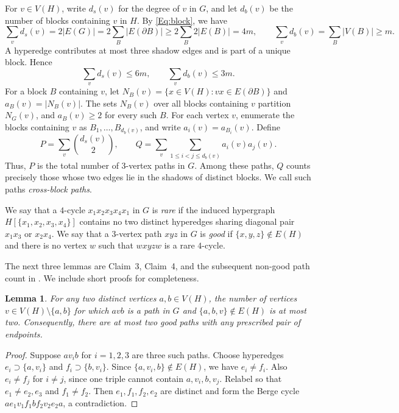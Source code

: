 \documentclass[11pt]{article}
\newtheorem{lemma}[theorem]{Lemma}
\begin{document}
For $v\in V(H)$, write $d_s(v)$ for the degree of $v$ in $G$, and let $d_b(v)$ be the number of blocks containing $v$ in $H$. By \eqref{Eq:block}, we have
\begin{equation}\label{eq:sums_low}       \sum_v d_s(v)=2|E(G)|=2\sum_B |E(\partial B)|
        \ge 2\sum_B 2|E(B)|=4m,   
         \qquad
        \sum_v d_b(v)=\sum_B |V(B)|\ge m.
\end{equation}
A hyperedge contributes at most three shadow edges
and is part of a unique block.  Hence
\[
    \sum_v d_s(v)\le 6m,
        \qquad
        \sum_v d_b(v)\le 3m.
\] 
For a block $B$ containing $v$, let $N_B(v)=\{x\in V(H): vx\in E(\partial B)\}$ and $a_B(v)=|N_B(v)|$. The sets $N_B(v)$ over all blocks containing $v$ partition $N_G(v)$, and $a_B(v)\ge2$ for every such $B$. For each vertex $v$, enumerate the blocks containing $v$ as $B_1,\ldots,B_{d_b(v)}$, and write $a_i(v)=a_{B_i}(v)$. Define
\[
        P=\sum_v\binom{d_s(v)}2,
        \qquad
        Q=\sum_v\sum_{1\le i<j\le d_b(v)}a_i(v)a_j(v).
\]
Thus, \(P\) is the total number of \(3\)-vertex paths in \(G\).
Among these paths, \(Q\) counts precisely those whose two edges lie in the shadows of distinct blocks. We call such paths \emph{cross-block paths}.

We say that a $4$-cycle $x_1x_2x_3x_4x_1$ in $G$ is \emph{rare} if the induced hypergraph $H[\{x_1,x_2,x_3,x_4\}]$ contains no two distinct hyperedges sharing diagonal pair $x_1x_3$ or $x_2x_4$. We say that a $3$-vertex path $xyz$ in $G$ is \emph{good} if $\{x,y,z\}\notin E(H)$ and there is no vertex $w$ such that $wxyzw$ is a rare $4$-cycle.

The next three lemmas are Claim~3, Claim~4, and the subsequent non-good path count in \cite{ergemlidze20203}. We include short proofs for completeness.

\begin{lemma}\label{lem:two-paths}
For any two distinct vertices $a,b\in V(H)$, the number of vertices
$v\in V(H)\setminus\{a,b\}$ for which $avb$ is a path in $G$ and
$\{a,b,v\}\notin E(H)$ is at most two.  Consequently, there are at most two
good paths with any prescribed pair of endpoints.
\end{lemma}

\begin{proof}
Suppose $av_i b$ for $i=1,2,3$ are three such paths. Choose hyperedges $e_i\supset\{a,v_i\}$ and $f_i\supset\{b,v_i\}$. Since $\{a,v_i,b\}\notin E(H)$, we have $e_i\ne f_i$. Also $e_i\ne f_j$ for $i\ne j$, since one triple cannot contain $a,v_i,b,v_j$. Relabel so that $e_1\ne e_2,e_3$ and $f_1\ne f_2$. Then $e_1,f_1,f_2,e_2$ are distinct and form the Berge cycle $ae_1v_1f_1bf_2v_2e_2a$, a contradiction.
\end{proof}
\end{document}
